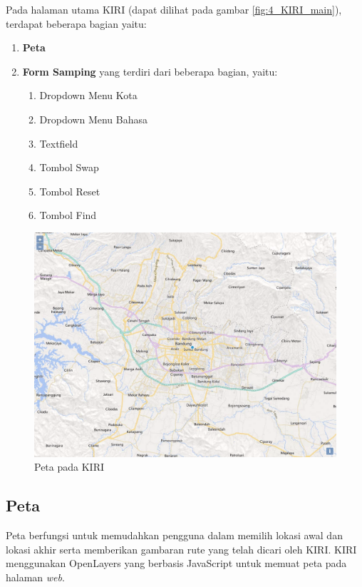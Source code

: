 Pada halaman utama KIRI (dapat dilihat pada gambar \ref{fig:4_KIRI_main}), terdapat beberapa bagian yaitu:
    \begin{enumerate}
    		\item \textbf{Peta}
    		\item \textbf{Form Samping} yang terdiri dari beberapa bagian, yaitu:
    		\begin{enumerate}
    			\item Dropdown Menu Kota
    			\item Dropdown Menu Bahasa
    			\item Textfield
    			\item Tombol Swap
    			\item Tombol Reset
    			\item Tombol Find
    		\end{enumerate}
    \end{enumerate}

\begin{figure}[H]
	\centering
	\includegraphics[scale=0.4]{Gambar/KIRI-peta}
	\caption{Peta pada KIRI} 
	\label{fig:4_KIRI_peta}
\end{figure}

\subsection{Peta}
Peta berfungsi untuk memudahkan pengguna dalam memilih lokasi awal dan lokasi akhir serta memberikan gambaran rute yang telah dicari oleh KIRI. KIRI menggunakan OpenLayers yang berbasis JavaScript untuk memuat peta pada halaman \textit{web}. 

